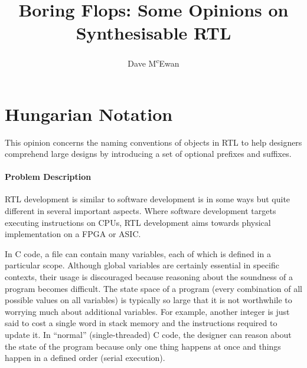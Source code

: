 \documentclass[a4paper]{article}
\newcommand{\doctitle}{{Boring Flops: Some Opinions on Synthesisable RTL}}
\begin{document}

\title{
  \doctitle
}

\author{
  Dave M\textsuperscript{c}Ewan
}

\maketitle

\begin{abstract}
\end{abstract}



\section{Hungarian Notation} %
\label{sec:HungarianNotation}
This opinion concerns the naming conventions of objects in \gls{RTL} to help
designers comprehend large designs by introducing a set of optional prefixes
and suffixes.

\paragraph{Problem Description} %
\label{sec:HungarianNotation_problem}

\gls{RTL} development is similar to software development is in some ways but
quite different in several important aspects.
Where software development targets executing instructions on
\glspl{CPU}, \gls{RTL} development aims towards physical implementation on a
\gls{FPGA} or \gls{ASIC}.

In C code, a file can contain many variables, each of which is defined in a
particular scope.
Although global variables are certainly essential in specific contexts, their
usage is discouraged because reasoning about the soundness of a program becomes
difficult.
The state space of a program (every combination of all possible values on all
variables) is typically so large that it is not worthwhile to worrying much
about additional variables.
For example, another integer is just said to cost a single word in stack memory
and the instructions required to update it.
In ``normal'' (single-threaded) C code, the designer can reason about the state
of the program because only one thing happens at once and things happen in a
defined order (serial execution).
\end{document}
